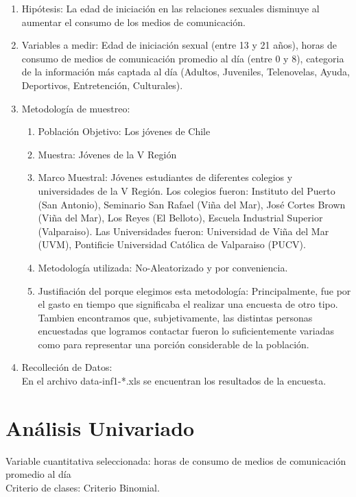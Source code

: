 \documentclass[letterpaper,spanish,11pt]{article}
\begin{document}
\begin{enumerate}
\item Hip\'otesis: La edad de iniciaci\'on en las relaciones sexuales disminuye al aumentar el consumo de los medios de comunicaci\'on.
\item Variables a medir: Edad de iniciaci\'on sexual (entre 13 y 21 a\~nos), horas de consumo de medios de comunicaci\'on promedio al d\'ia (entre 0 y 8), categoria de la informaci\'on m\'as captada al d\'ia (Adultos, Juveniles, Telenovelas, Ayuda, Deportivos, Entretenci\'on, Culturales).
\item Metodolog\'ia de muestreo:
	\begin{enumerate}
		\item Poblaci\'on Objetivo:
				Los j\'ovenes de Chile
		\item Muestra:
				J\'ovenes de la V Regi\'on
		\item Marco Muestral:
				J\'ovenes estudiantes de diferentes colegios y universidades de la V Regi\'on. Los colegios fueron: Instituto del Puerto (San Antonio), Seminario San Rafael (Vi\~na del Mar), Jos\'e Cortes Brown (Vi\~na del Mar), Los Reyes (El Belloto), Escuela Industrial Superior (Valparaiso). Las Universidades fueron: Universidad de Vi\~na del Mar (UVM), Pontificie Universidad Cat\'olica de Valparaiso (PUCV).
		\item Metodolog\'ia utilizada:
				No-Aleatorizado y por conveniencia.
		\item Justifiaci\'on del porque elegimos esta metodolog\'ia:
       				Principalmente, fue por el gasto en tiempo que significaba el realizar una encuesta de otro tipo.\\
				Tambien encontramos que, subjetivamente, las distintas personas encuestadas que logramos contactar fueron lo suficientemente variadas como para representar una porci\'on considerable de la poblaci\'on.
	\end{enumerate}
\item Recolleci\'on de Datos:\\
	En el archivo data-inf1-*.xls se encuentran los resultados de la encuesta.

\end{enumerate}

\section*{An\'alisis Univariado}
Variable cuantitativa seleccionada: horas de consumo de medios de comunicaci\'on promedio al d\'ia\\
Criterio de clases: Criterio Binomial.
\end{document}
